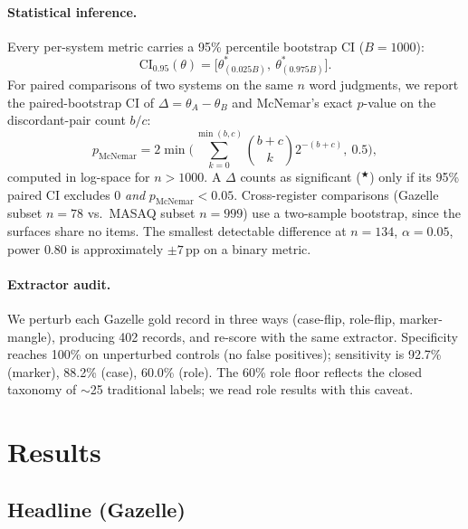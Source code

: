\documentclass[10pt,a4paper,twocolumn]{article}
\newcommand{\sig}{\ensuremath{^{\bigstar}}}
\begin{document}
\paragraph{Statistical inference.}
Every per-system metric carries a 95\% percentile bootstrap CI ($B{=}1000$):
\begin{equation}
\mathrm{CI}_{0.95}(\theta) = \bigl[\theta^*_{(0.025B)},\ \theta^*_{(0.975B)}\bigr].
\label{eq:bootci}
\end{equation}
For paired comparisons of two systems on the same $n$ word judgments, we report the paired-bootstrap CI of $\Delta = \theta_A - \theta_B$ and McNemar's exact $p$-value on the discordant-pair count $b/c$:
\begin{equation}
p_{\text{McNemar}} = 2 \min\Biggl( \sum_{k=0}^{\min(b,c)} \binom{b+c}{k} 2^{-(b+c)},\ 0.5 \Biggr),
\label{eq:mcnemar}
\end{equation}
computed in log-space for $n{>}1000$. A $\Delta$ counts as significant (\sig{}) only if its 95\% paired CI excludes 0 \emph{and} $p_{\text{McNemar}} < 0.05$. Cross-register comparisons (Gazelle subset $n{=}78$ vs.\ MASAQ subset $n{=}999$) use a two-sample bootstrap, since the surfaces share no items. The smallest detectable difference at $n{=}134$, $\alpha{=}0.05$, power $0.80$ is approximately $\pm 7$\,pp on a binary metric.

\paragraph{Extractor audit.}
We perturb each Gazelle gold record in three ways (case-flip, role-flip, marker-mangle), producing 402 records, and re-score with the same extractor. Specificity reaches 100\% on unperturbed controls (no false positives); sensitivity is 92.7\% (marker), 88.2\% (case), 60.0\% (role). The 60\% role floor reflects the closed taxonomy of $\sim$25 traditional labels; we read role results with this caveat.

\section{Results}
\label{sec:results}

\subsection{Headline (Gazelle)}
\end{document}
